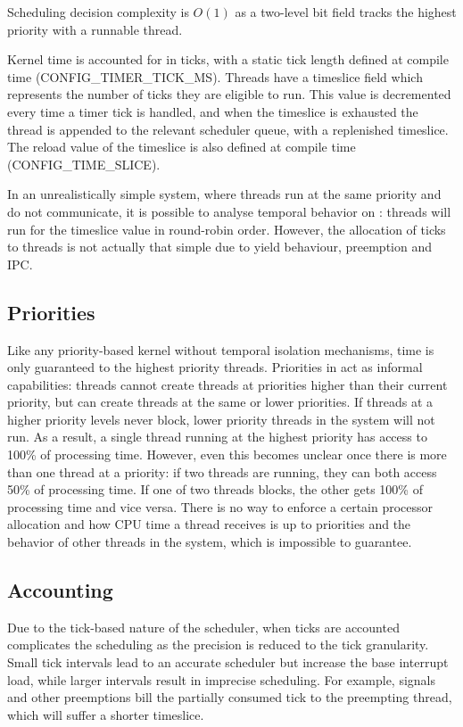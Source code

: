 Scheduling decision complexity is $O(1)$ as a two-level bit field tracks the highest priority with a runnable thread.

Kernel time is accounted for in ticks, with a static tick length defined at compile time (CONFIG\_TIMER\_TICK\_MS).
Threads have a timeslice field which represents the number of ticks they are eligible to run. 
This value is decremented every time a timer tick is handled, and when the timeslice is exhausted the thread is appended to the relevant scheduler queue, with a replenished timeslice.
The reload value of the timeslice is also defined at compile time (CONFIG\_TIME\_SLICE).

In an unrealistically simple system, where threads run at the same priority and do not communicate, it is possible to analyse temporal behavior on \selfour: threads will run for the timeslice value in round-robin order.
However, the allocation of ticks to threads is not actually that simple due to yield behaviour, preemption and \gls{IPC}. 

\subsection{Priorities}

Like any priority-based kernel without temporal isolation mechanisms, time is only guaranteed to the highest priority threads.
Priorities in \selfour act as informal capabilities: threads cannot create threads at priorities higher than their current priority, but can create threads at the same or lower priorities.
If threads at a higher priority levels never block, lower priority threads in the system will not run.
As a result, a single thread running at the highest priority has access to 100\% of processing time.
However, even this becomes unclear once there is more than one thread at a priority: if two threads are running, they can both access 50\% of processing time.
If one of two threads blocks, the other gets 100\% of processing time and vice versa.
There is no way to enforce a certain processor allocation and how CPU time a thread receives is up to priorities and the behavior of other threads in the system, which is impossible to guarantee.

\subsection{Accounting}
Due to the tick-based nature of the \selfour scheduler, when ticks are accounted complicates the
scheduling as the precision is reduced to the tick granularity. Small tick intervals lead to an
accurate scheduler but increase the base interrupt load, while larger intervals result in imprecise
scheduling.  For example, signals and other preemptions bill the partially consumed tick to the
preempting thread, which will suffer a shorter timeslice. 

